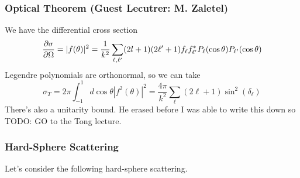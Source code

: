 \documentclass{article}
\author{Connor Duncan}
\date{\today}
\theoremstyle{definition}
\begin{document}
\subsubsection{Optical Theorem (Guest Lecutrer: M. Zaletel)}
We have the differential cross section
\begin{equation}
	\pdv{\sigma}{\Omega}=|f(\theta)|^2=\frac{1}{k^2}\sum_{\ell,\ell'}(2l+1)(2\ell'+1)f_\ell f^*_{\ell'}P_\ell(\cos\theta)P_{\ell'}(\cos\theta)
\end{equation}
Legendre polynomials are orthonormal, so we can take 
\begin{equation}
	\sigma_T=2\pi\int_{-1}^1d\cos\theta |f^2(\theta)|^2=\frac{4\pi}{k^2}\sum_{\ell}(2\ell+1)\sin^2(\delta_\ell)
\end{equation}
There's also a unitarity bound. He erased before I was able to write this down so TODO: GO to the Tong lecture.

\subsubsection{Hard-Sphere Scattering}
Let's consider the following hard-sphere scattering.
\end{document}
